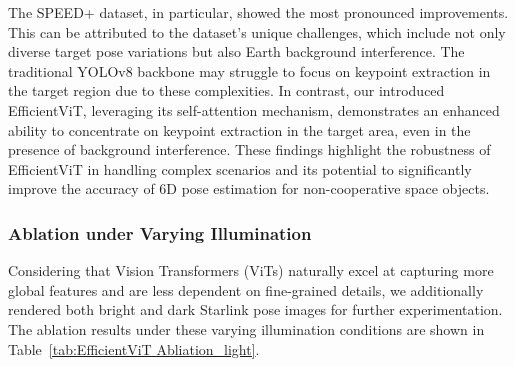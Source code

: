 \documentclass[a4paper,fleqn]{cas-sc}
\begin{document}
The SPEED+ dataset, in particular, showed the most pronounced improvements. This can be attributed to the dataset's unique challenges, which include not only diverse target pose variations but also Earth background interference. The traditional YOLOv8 backbone may struggle to focus on keypoint extraction in the target region due to these complexities. In contrast, our introduced EfficientViT, leveraging its self-attention mechanism, demonstrates an enhanced ability to concentrate on keypoint extraction in the target area, even in the presence of background interference.
These findings highlight the robustness of EfficientViT in handling complex scenarios and its potential to significantly improve the accuracy of 6D pose estimation for non-cooperative space objects.
\begin{table}[!htbp]
    \centering
    \caption{EfficientViT Ablation on SPEED+, Nauka MLM, Starlink synthetic datasets}
    \label{tab:EfficientViTAblation}
\end{table}

\subsubsection{Ablation under Varying Illumination}
Considering that Vision Transformers (ViTs) naturally excel at capturing more global features and are less dependent on fine-grained details, we additionally rendered both bright and dark Starlink pose images for further experimentation. The ablation results under these varying illumination conditions are shown in Table~\ref{tab:EfficientViT Abliation_light}.
\end{document}
